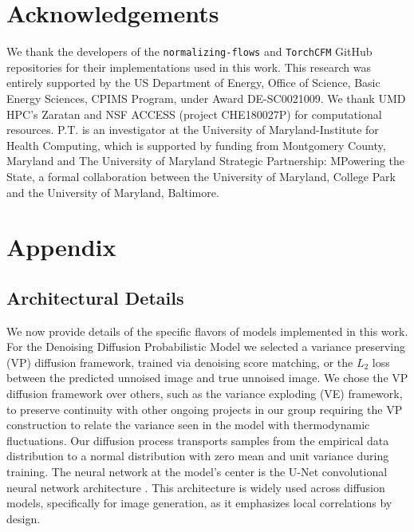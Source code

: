 \documentclass[%
 aip,
 amsmath,amssymb,
 reprint,%
]{revtex4-1}
\begin{document}
{\section{Acknowledgements}
\label{sec:acknowledgments}

We thank the developers of the \texttt{normalizing-flows} and \texttt{TorchCFM} GitHub repositories for their implementations used in this work. This research was entirely supported by the US Department of Energy, Office of Science, Basic Energy Sciences, CPIMS Program, under Award DE-SC0021009. We thank UMD HPC's Zaratan and NSF ACCESS (project CHE180027P) for computational resources. P.T. is an investigator at the University of Maryland-Institute for Health Computing, which is supported by funding from Montgomery County, Maryland and The University of Maryland Strategic Partnership: MPowering the State, a formal collaboration between the University of Maryland, College Park and the University of Maryland, Baltimore. \newline



\section{Appendix}
\label{sec:appendix}

\subsection{Architectural Details}
\label{sec:architectural-details}

We now provide details of the specific flavors of models implemented in this work. For the Denoising Diffusion Probabilistic Model we selected a variance preserving (VP) diffusion framework, trained via denoising score matching, or the $L_2$ loss between the predicted unnoised image and true unnoised image. We chose the VP diffusion framework over others, such as the variance exploding (VE) framework, to preserve continuity with other ongoing projects in our group\cite{thermomaps-2023} requiring the VP construction to relate the variance seen in the model with thermodynamic fluctuations. Our diffusion process transports samples from the empirical data distribution to a normal distribution with zero mean and unit variance during training. The neural network at the model's center is the U-Net convolutional neural network architecture \cite{ronneberger2015u}. This architecture is widely used across diffusion models, specifically for image generation, as it emphasizes local correlations by design.

}
\end{document}
